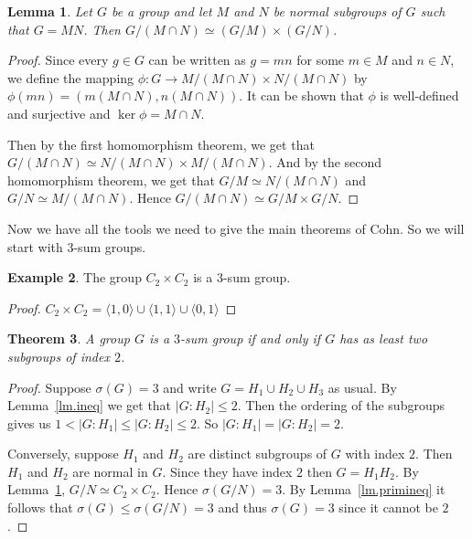 \documentclass[12pt]{amsart}
\newtheorem{theorem}{Theorem}
\newtheorem{lemma}[theorem]{Lemma}
\theoremstyle{definition}
\newtheorem{example}[theorem]{Example}
\theoremstyle{remark}
\begin{document}
\begin{lemma}
\label{lm.quot}
Let \( G \) be a group and let \( M \) and \( N \) be normal subgroups of \( G \) such that \( G = MN \). Then \( G/(M \cap N) \simeq (G/M) \times (G/N) \).
\end{lemma}
\begin{proof}
Since every \( g \in G \) can be written as \( g = mn \) for some \( m \in M \) and \( n \in N \), we define the mapping \( \phi:G \to M/(M \cap N) \times N/(M \cap N) \) by \( \phi(mn) = (m(M \cap N), n(M \cap N)) \).  It can be shown that \( \phi \) is well-defined and surjective and \( \ker{\phi} = M \cap N \).

Then by the first homomorphism theorem, we get that \( G/(M \cap N) \simeq N/(M \cap N) \times M/(M \cap N) \).  And by the second homomorphism theorem, we get that \( G/M \simeq N/(M \cap N) \) and \( G/N \simeq M/(M \cap N) \).  Hence \( G/(M \cap N) \simeq G/M \times G/N \).
\end{proof}

Now we have all the tools we need to give the main theorems of Cohn.  So we will start with \(3\)-sum groups.

\begin{example}
The group \( C_2 \times C_2 \) is a \(3\)-sum group.
\end{example}
\begin{proof}
\( C_2 \times C_2 = \langle 1,0 \rangle \cup \langle 1,1 \rangle \cup \langle 0, 1 \rangle \)
\end{proof}

\begin{theorem}
\label{th.3sum}
A group \( G \) is a \( 3 \)-sum group if and only if \( G \) has as least two subgroups of index \( 2 \).
\end{theorem}
\begin{proof}
Suppose \( \sigma(G) = 3 \) and write \( G = H_1 \cup H_2 \cup H_3 \) as usual.  By Lemma~\ref{lm.ineq} we get that \( |G:H_2| \leq 2 \).  Then the ordering of the subgroups gives us \( 1 < |G:H_1| \leq |G:H_2| \leq 2 \).  So \( |G:H_1| = |G:H_2| = 2 \).

Conversely, suppose \( H_1 \) and \( H_2 \) are distinct subgroups of \( G \) with index \(2\).  Then \( H_1 \) and \( H_2 \) are normal in \( G \).  Since they have index \(2\) then \( G = H_1 H_2 \).  By Lemma~\ref{lm.quot}, \( G/N \simeq C_2 \times C_2 \).  Hence \( \sigma(G/N) = 3 \).  By Lemma~\ref{lm.primineq} it follows that \( \sigma(G) \leq \sigma(G/N) = 3 \) and thus \( \sigma(G) = 3 \) since it cannot be \( 2 \).
\end{proof}
\end{document}
